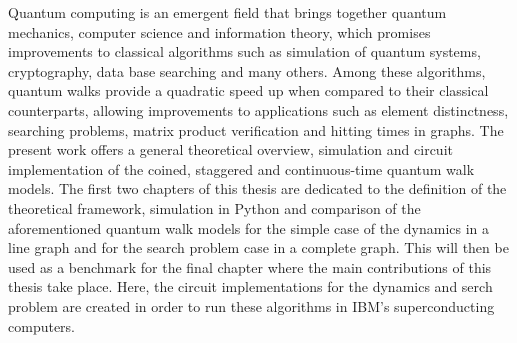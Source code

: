 \documentclass[../../dissertation.tex]{subfiles}
\begin{document}
Quantum computing is an emergent field that brings together quantum mechanics,
computer science and information theory, which promises improvements to
classical algorithms such as simulation of quantum systems, cryptography, data
base searching and many others.  Among these algorithms, quantum walks provide
a quadratic speed up when compared to their classical  counterparts,  allowing
improvements to applications such as element distinctness, searching problems,
matrix product verification and hitting times in graphs.  The present work
offers a general theoretical overview, simulation and circuit implementation of
the coined, staggered and continuous-time quantum walk models. The first two
chapters of this thesis are dedicated to the definition of the theoretical
framework, simulation in Python and comparison of the aforementioned quantum
walk models for the simple case of the dynamics in a line graph and for the
search problem case in a complete graph. This will then be used as a benchmark
for the final chapter where the main contributions of this thesis take place.
Here, the circuit implementations for the dynamics and serch problem are
created in order to run these algorithms in IBM's superconducting computers.
\end{document}
